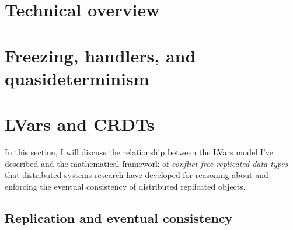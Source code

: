 \documentclass{article}
\begin{document}

\section{Technical overview}

\section{Freezing, handlers, and quasideterminism}

\section{LVars and CRDTs}

In this section, I will discuss the relationship between the LVars
model I've described and the mathematical framework of
\emph{conflict-free replicated data types} that distributed systems
research have developed for reasoning about and enforcing the eventual
consistency of distributed replicated objects.

\subsection{Replication and eventual consistency}
\end{document}
